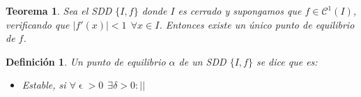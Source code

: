 \documentclass[11pt, a4paper, titlepage]{article}
\let\epsilon\upvarepsilon
\theoremstyle{theorem-style}
\newtheorem*{nth}{Teorema}
\theoremstyle{definition-style}
\newtheorem*{ndef}{Definición}
\theoremstyle{remark-style}
\theoremstyle{example-style}
\begin{document}
\begin{nth}
	Sea el SDD $\{I,f\}$ donde $I$ es cerrado y supongamos que $f\in \mathcal{C}^1(I)$, verificando que $|f'(x)|< 1 \ \ \forall x \in I$. Entonces existe un único punto de equilibrio de $f$.
\end{nth}

\begin{ndef}
	Un punto de equilibrio $\alpha$ de un SDD $\{I,f\}$ se dice que es:
	\begin{itemize}
	\item Estable, si $\forall \epsilon > 0 \ \ \exists \delta > 0 : ||$
\end{itemize}
\end{ndef}
\end{document}
